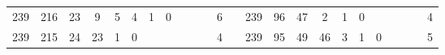 {\begin{tabular}{cccccccccccclccccccccccc}
239                                                & 216                                                & 23                                               & 9                                                & 5                                                & 4                                                & 1                                               & 0                                               &                                                 &                                                 &                                                 & 6                                                &                          & 239                                                & 96                                                 & 47                                               & 2                                                & 1                                               & 0                                               &                                                 &                                                 &                                                 &                                                 & 4                                                \\
239                                                & 215                                                & 24                                               & 23                                               & 1                                                & 0                                                &                                                 &                                                 &                                                 &                                                 &                                                 & 4                                                &                          & 239                                                & 95                                                 & 49                                               & 46                                               & 3                                               & 1                                               & 0                                               &                                                 &                                                 &                                                 & 5                                                \\

\end{tabular}}
